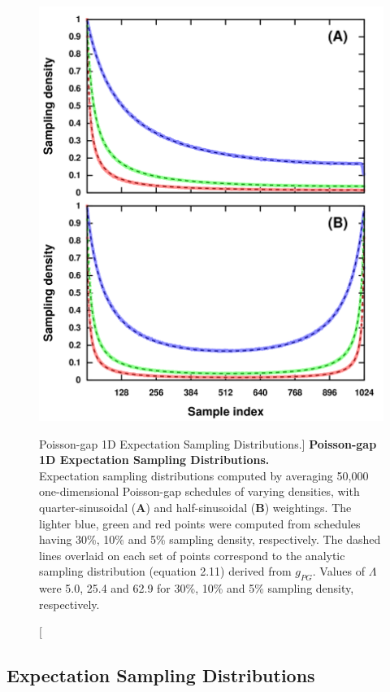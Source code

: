 \begin{figure}[ht!]
\begin{center}
  \includegraphics[width=4.5in]{figs/dgs/02-expect-1d.png}
\end{center}
\caption
      [Poisson-gap 1D Expectation Sampling Distributions.]{
  {\bf Poisson-gap 1D Expectation Sampling Distributions.}
  \\
  Expectation sampling distributions computed by averaging 50,000
  one-dimensional Poisson-gap schedules of varying densities, with
  quarter-sinusoidal ({\bf A}) and half-sinusoidal ({\bf B}) weightings.
  The lighter blue, green and red points were computed from schedules having
  30\%, 10\% and 5\% sampling density, respectively. The dashed lines overlaid
  on each set of points correspond to the analytic sampling distribution
  (equation 2.11) derived from $g_{PG}$. Values of $\Lambda$ were 5.0, 25.4
  and 62.9 for 30\%, 10\% and 5\% sampling density, respectively.
}
\label{figure.2.2}
\end{figure}

\subsection{Expectation Sampling Distributions}

